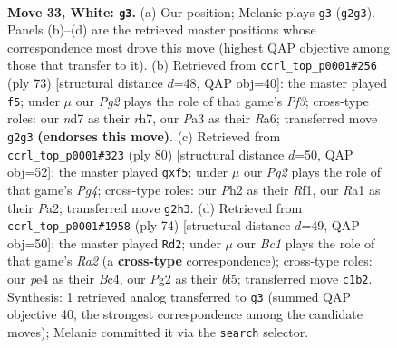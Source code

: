 \documentclass[11pt]{article}
\begin{document}
\clearpage

\begin{figure}[p]\centering
\begin{subfigure}{0.46\textwidth}\centering
\resizebox{\linewidth}{!}{%
\newchessgame
\chessboard[
  setfen={7r/3n1k2/8/8/p1p1p3/P1P4p/2PK1PPP/R1B5 w - - 0 33},
  showmover=false,
  pgfstyle=straightmove, color=movearrow, markmove={g2-g3}
]}
\caption{}
\end{subfigure}\hfill
\begin{subfigure}{0.46\textwidth}\centering
\resizebox{\linewidth}{!}{%
\newchessgame
\chessboard[
  setfen={3kb3/7R/r3ppp1/2p3P1/p1P2P2/P1K2B2/2P5/8 b - - 0 37},
  showmover=false,
  pgfstyle=straightmove, color=movearrow, markmove={f6-f5}
]}
\caption{}
\end{subfigure}
\\[4pt]
\begin{subfigure}{0.46\textwidth}\centering
\resizebox{\linewidth}{!}{%
\newchessgame
\chessboard[
  setfen={8/2r2k2/p3p2p/1p3p1P/5PP1/1PB1b3/PK6/5R2 w - - 0 41},
  showmover=false,
  pgfstyle=straightmove, color=movearrow, markmove={g4-f5}
]}
\caption{}
\end{subfigure}\hfill
\begin{subfigure}{0.46\textwidth}\centering
\resizebox{\linewidth}{!}{%
\newchessgame
\chessboard[
  setfen={r7/4p2k/2p1P3/p4bpp/P1B4P/1PP5/R6K/8 w - - 2 38},
  showmover=false,
  pgfstyle=straightmove, color=movearrow, markmove={a2-d2}
]}
\caption{}
\end{subfigure}
\caption{\textbf{Move 33, White: \texttt{g3}.} (a) Our position; Melanie plays \texttt{g3} (\texttt{g2g3}). Panels (b)--(d) are the retrieved master positions whose correspondence most drove this move (highest QAP objective among those that transfer to it). (b) Retrieved from \texttt{ccrl\_top\_p0001\#256} (ply 73) [structural distance $d$=48, QAP obj=40]: the master played \texttt{f5}; under $\mu$ our \emph{Pg2} plays the role of that game's \emph{Pf3}; cross-type roles: our \emph{n}d7 as their \emph{r}h7, our \emph{P}a3 as their \emph{R}a6; transferred move \texttt{g2g3} \textbf{(endorses this move)}. (c) Retrieved from \texttt{ccrl\_top\_p0001\#323} (ply 80) [structural distance $d$=50, QAP obj=52]: the master played \texttt{gxf5}; under $\mu$ our \emph{Pg2} plays the role of that game's \emph{Pg4}; cross-type roles: our \emph{P}h2 as their \emph{R}f1, our \emph{R}a1 as their \emph{P}a2; transferred move \texttt{g2h3}. (d) Retrieved from \texttt{ccrl\_top\_p0001\#1958} (ply 74) [structural distance $d$=49, QAP obj=50]: the master played \texttt{Rd2}; under $\mu$ our \emph{Bc1} plays the role of that game's \emph{Ra2} (a \textbf{cross-type} correspondence); cross-type roles: our \emph{p}e4 as their \emph{B}c4, our \emph{P}g2 as their \emph{b}f5; transferred move \texttt{c1b2}. Synthesis: 1 retrieved analog transferred to \texttt{g3} (summed QAP objective 40, the strongest correspondence among the candidate moves); Melanie committed it via the \texttt{search} selector.}
\label{fig:thought-m64}
\end{figure}
\end{document}

